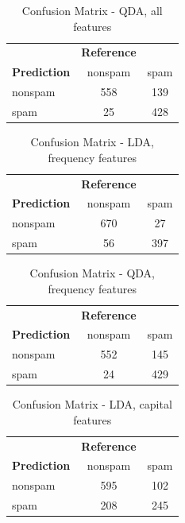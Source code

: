 \documentclass{article}\usepackage[]{graphicx}\usepackage[]{xcolor}
\begin{document}
\begin{table}[h]
	\centering
	\begin{tabular}{lcc}
		& \textbf{Reference} & \\
		\textbf{Prediction} & nonspam & spam \\
		nonspam & 558 & 139 \\
		spam & 25 & 428 \\
	\end{tabular}
	\caption{Confusion Matrix - QDA, all features}
	\label{tab:confusion_matrix_qda1_log}
\end{table}
\begin{table}[h]
	\centering
	\begin{tabular}{lcc}
		& \textbf{Reference} & \\
		\textbf{Prediction} & nonspam & spam \\
		nonspam & 670 & 27 \\
		spam & 56 & 397 \\
	\end{tabular}
	\caption{Confusion Matrix - LDA, frequency features}
	\label{tab:confusion_matrix_lda2}
\end{table}

\begin{table}[h]
	\centering
	\begin{tabular}{lcc}
		& \textbf{Reference} & \\
		\textbf{Prediction} & nonspam & spam \\
		nonspam & 552 & 145 \\
		spam & 24 & 429 \\
	\end{tabular}
	\caption{Confusion Matrix - QDA, frequency features}
	\label{tab:confusion_matrix_qda2}
\end{table}
\begin{table}[h]
	\centering
	\begin{tabular}{lcc}
		& \textbf{Reference} & \\
		\textbf{Prediction} & nonspam & spam \\
		nonspam & 595 & 102 \\
		spam & 208 & 245 \\
	\end{tabular}
	\caption{Confusion Matrix - LDA, capital features}
	\label{tab:confusion_matrix_lda3}
\end{table}
\end{document}
